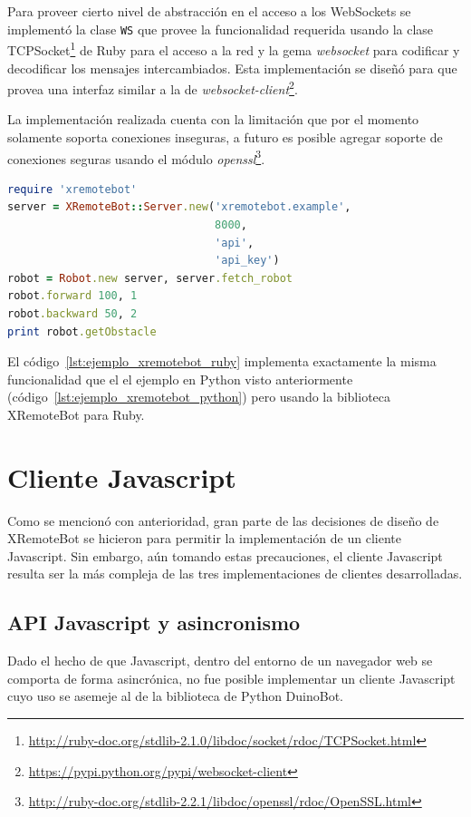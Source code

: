 Para proveer cierto nivel de abstracción en el acceso a los WebSockets
se implementó la clase
\texttt{WS} que provee la funcionalidad requerida
usando la clase TCPSocket\footnote{\url{http://ruby-doc.org/stdlib-2.1.0/libdoc/socket/rdoc/TCPSocket.html}}
de Ruby para el acceso a la red y
la gema \textit{websocket} para codificar y decodificar los mensajes intercambiados.
Esta implementación se diseñó para que provea una interfaz similar a la de
\textit{websocket-client}\footnote{\url{https://pypi.python.org/pypi/websocket-client}}.

La implementación realizada cuenta con la limitación que por
el momento solamente soporta conexiones inseguras, a futuro es
posible agregar soporte de conexiones seguras usando el módulo
\textit{openssl}\footnote{\url{http://ruby-doc.org/stdlib-2.2.1/libdoc/openssl/rdoc/OpenSSL.html}}.

\begin{lstlisting}[language=Ruby,
caption={Ejemplo usando XRemoteBot para Ruby},
label=lst:ejemplo_xremotebot_ruby]
require 'xremotebot'
server = XRemoteBot::Server.new('xremotebot.example',
                                8000,
                                'api',
                                'api_key')
robot = Robot.new server, server.fetch_robot
robot.forward 100, 1
robot.backward 50, 2
print robot.getObstacle
\end{lstlisting}

El código~\ref{lst:ejemplo_xremotebot_ruby} implementa exactamente la misma funcionalidad que
el el ejemplo en Python visto anteriormente (código~\ref{lst:ejemplo_xremotebot_python}) pero
usando la biblioteca XRemoteBot para Ruby.

\section{Cliente Javascript}\label{sec:javascript}
Como se mencionó con anterioridad, gran parte de las decisiones de diseño de XRemoteBot
se hicieron para permitir la implementación de un cliente Javascript. Sin embargo, aún
tomando estas precauciones, el cliente Javascript resulta ser la más compleja de las
tres implementaciones de clientes desarrolladas.

\subsection{API Javascript y asincronismo}
Dado el hecho
de que Javascript, dentro del entorno de un navegador web se comporta de forma asincrónica,
no fue posible implementar un cliente Javascript cuyo uso se asemeje al de la biblioteca
de Python DuinoBot.

